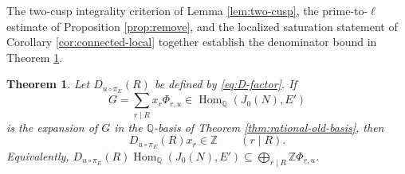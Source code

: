 \documentclass[12pt, letterpaper]{amsart}
\newtheorem{theorem}{Theorem}[section]
\theoremstyle{definition}
\theoremstyle{remark}
\newcommand{\Q}{\mathbb Q}
\newcommand{\Z}{\mathbb Z}
\newcommand{\Hom}{\operatorname{Hom}}
\numberwithin{equation}{section}
\begin{document}
The two-cusp integrality criterion of Lemma \ref{lem:two-cusp}, the
prime-to-\(\ell\) estimate of Proposition \ref{prop:remove}, and the localized
saturation statement of Corollary \ref{cor:connected-local} together establish
the denominator bound in Theorem \ref{thm:denominator}.

\begin{theorem}\label{thm:denominator}
Let \(D_{u\circ\pi_E}(R)\) be defined by \eqref{eq:D-factor}. If
\[
        G=\sum_{r\mid R}x_r\Phi_{r,u}\in\Hom_\Q(J_0(N),E')
\]
is the expansion of \(G\) in the \(\Q\)-basis of Theorem
\ref{thm:rational-old-basis}, then
\begin{equation}\label{eq:global-denominator}
        D_{u\circ\pi_E}(R)x_r\in\Z
        \qquad(r\mid R).
\end{equation}
Equivalently,
\(D_{u\circ\pi_E}(R)\Hom_\Q(J_0(N),E')\subseteq
\bigoplus_{r\mid R}\Z\Phi_{r,u}\).
\end{theorem}
\end{document}
